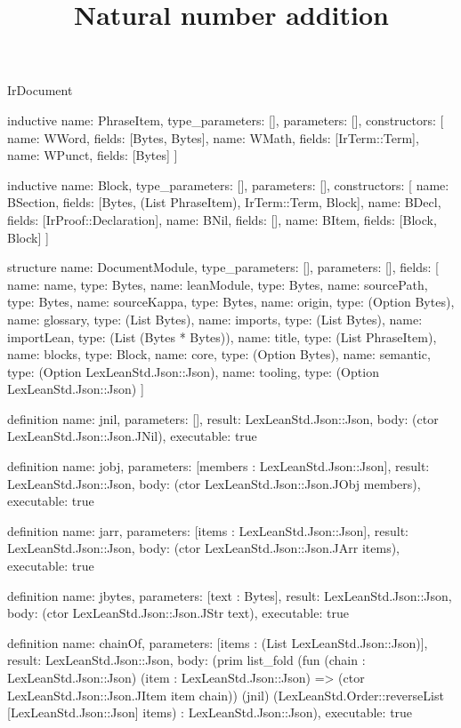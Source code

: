 \begin{lexlean}{IrDocument}
\title{Natural number addition}
\begin{semanticmodule}
inductive{
  name: PhraseItem,
  type_parameters: [],
  parameters: [],
  constructors: [
    {name: WWord, fields: [Bytes, Bytes]},
    {name: WMath, fields: [IrTerm::Term]},
    {name: WPunct, fields: [Bytes]}
  ]
}

inductive{
  name: Block,
  type_parameters: [],
  parameters: [],
  constructors: [
    {name: BSection, fields: [Bytes, (List PhraseItem), IrTerm::Term, Block]},
    {name: BDecl, fields: [IrProof::Declaration]},
    {name: BNil, fields: []},
    {name: BItem, fields: [Block, Block]}
  ]
}

structure{
  name: DocumentModule,
  type_parameters: [],
  parameters: [],
  fields: [
    {name: name, type: Bytes},
    {name: leanModule, type: Bytes},
    {name: sourcePath, type: Bytes},
    {name: sourceKappa, type: Bytes},
    {name: origin, type: (Option Bytes)},
    {name: glossary, type: (List Bytes)},
    {name: imports, type: (List Bytes)},
    {name: importLean, type: (List (Bytes * Bytes))},
    {name: title, type: (List PhraseItem)},
    {name: blocks, type: Block},
    {name: core, type: (Option Bytes)},
    {name: semantic, type: (Option LexLeanStd.Json::Json)},
    {name: tooling, type: (Option LexLeanStd.Json::Json)}
  ]
}

definition{
  name: jnil,
  parameters: [],
  result: LexLeanStd.Json::Json,
  body: (ctor LexLeanStd.Json::Json.JNil),
  executable: true
}

definition{
  name: jobj,
  parameters: [members : LexLeanStd.Json::Json],
  result: LexLeanStd.Json::Json,
  body: (ctor LexLeanStd.Json::Json.JObj members),
  executable: true
}

definition{
  name: jarr,
  parameters: [items : LexLeanStd.Json::Json],
  result: LexLeanStd.Json::Json,
  body: (ctor LexLeanStd.Json::Json.JArr items),
  executable: true
}

definition{
  name: jbytes,
  parameters: [text : Bytes],
  result: LexLeanStd.Json::Json,
  body: (ctor LexLeanStd.Json::Json.JStr text),
  executable: true
}

definition{
  name: chainOf,
  parameters: [items : (List LexLeanStd.Json::Json)],
  result: LexLeanStd.Json::Json,
  body: (prim list_fold (fun (chain : LexLeanStd.Json::Json) (item : LexLeanStd.Json::Json) => (ctor LexLeanStd.Json::Json.JItem item chain)) (jnil) (LexLeanStd.Order::reverseList [LexLeanStd.Json::Json] items) : LexLeanStd.Json::Json),
  executable: true
}


\end{semanticmodule}
\end{lexlean}

